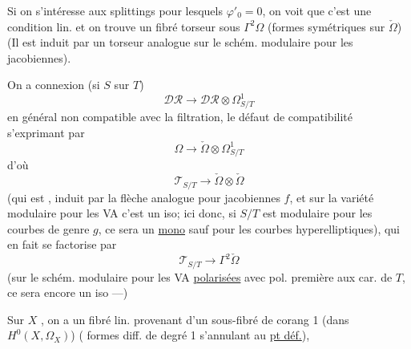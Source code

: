 Si on s'intéresse aux splittings pour lesquels $\varphi'_0=0$, on voit que c'est une condition lin. et on trouve un fibré torseur sous $\Gamma^2\Omega$ (formes symétriques sur $\check\Omega$)
(Il est induit par un torseur analogue sur le schém. modulaire pour les    jacobiennes).

On a connexion  (si $S$ sur $T$)
\[
\mathcal{DR}\longrightarrow\mathcal{DR}\otimes\Omega^1_{S/T}
\]
en général non compatible avec la filtration, le défaut de compatibilité s'exprimant par
\[
\Omega\longrightarrow\check\Omega\otimes\Omega^1_{S/T}
\]
d'où
\[
\mathcal{T}_{S/T}\longrightarrow\check\Omega\otimes\check\Omega
\]
(qui est , induit par la flèche analogue pour jacobiennes $f$, et sur la variété modulaire pour les VA  c'est un iso; ici donc,  si $S/T$ est modulaire pour les courbes de genre $g$, ce sera un \uline{mono} sauf pour les courbes hyperelliptiques), qui en fait se factorise par
\[
\mathcal{T}_{S/T}\longrightarrow\Gamma^2\check\Omega
\]
(sur le schém. modulaire pour les VA \uline{polarisées} avec pol.  première aux car. de $T$, ce sera encore un iso ---)

Sur $X$ , on a un fibré lin. provenant d'un sous-fibré de corang 1 (dans  $H^0(X,\Omega_X)$) ( formes diff. de degré 1 s'annulant au \uline{pt déf.}),
